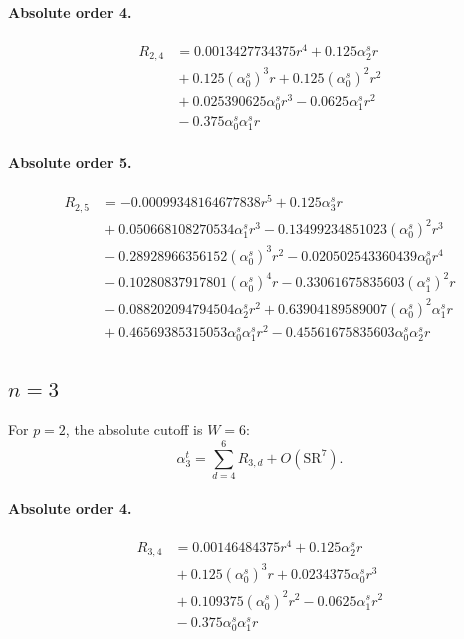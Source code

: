 \documentclass[10pt]{article}
\begin{document}
\paragraph{Absolute order 4.}
\begin{align*}
R_{2,4} &= 0.0013427734375 r^{4} + 0.125 \alpha_{2}^s r \\
&{}  + 0.125 \left(\alpha_{0}^s\right)^{3} r + 0.125 \left(\alpha_{0}^s\right)^{2} r^{2} \\
&{}  + 0.025390625 \alpha_{0}^s r^{3} - 0.0625 \alpha_{1}^s r^{2} \\
&{}  - 0.375 \alpha_{0}^s \alpha_{1}^s r
\end{align*}

\paragraph{Absolute order 5.}
\begin{align*}
R_{2,5} &=  - 0.00099348164677838 r^{5} + 0.125 \alpha_{3}^s r \\
&{}  + 0.050668108270534 \alpha_{1}^s r^{3} - 0.13499234851023 \left(\alpha_{0}^s\right)^{2} r^{3} \\
&{}  - 0.28928966356152 \left(\alpha_{0}^s\right)^{3} r^{2} - 0.020502543360439 \alpha_{0}^s r^{4} \\
&{}  - 0.10280837917801 \left(\alpha_{0}^s\right)^{4} r - 0.33061675835603 \left(\alpha_{1}^s\right)^{2} r \\
&{}  - 0.088202094794504 \alpha_{2}^s r^{2} + 0.63904189589007 \left(\alpha_{0}^s\right)^{2} \alpha_{1}^s r \\
&{}  + 0.46569385315053 \alpha_{0}^s \alpha_{1}^s r^{2} - 0.45561675835603 \alpha_{0}^s \alpha_{2}^s r
\end{align*}

\subsection{$n=3$}
For $p=2$, the absolute cutoff is $W=6$:
\[\alpha_{3}^t=\sum_{d=4}^{6}R_{3,d}+O(\mathrm{SR}^{7}).\]
\paragraph{Absolute order 4.}
\begin{align*}
R_{3,4} &= 0.00146484375 r^{4} + 0.125 \alpha_{2}^s r \\
&{}  + 0.125 \left(\alpha_{0}^s\right)^{3} r + 0.0234375 \alpha_{0}^s r^{3} \\
&{}  + 0.109375 \left(\alpha_{0}^s\right)^{2} r^{2} - 0.0625 \alpha_{1}^s r^{2} \\
&{}  - 0.375 \alpha_{0}^s \alpha_{1}^s r
\end{align*}
\end{document}
